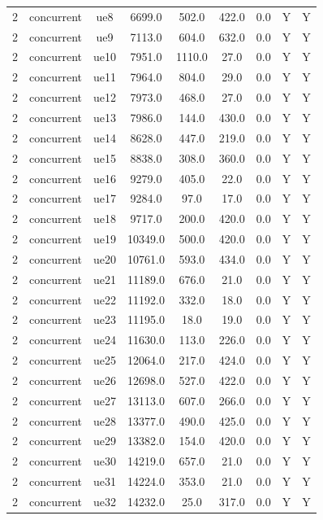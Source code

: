 \begin{table}[ht]
\begin{tabular}{|c|c|c|c|c|c|c|c|c|}
2 & concurrent & ue8 & 6699.0 & 502.0 & 422.0 & 0.0 & Y & Y \\
2 & concurrent & ue9 & 7113.0 & 604.0 & 632.0 & 0.0 & Y & Y \\
2 & concurrent & ue10 & 7951.0 & 1110.0 & 27.0 & 0.0 & Y & Y \\
2 & concurrent & ue11 & 7964.0 & 804.0 & 29.0 & 0.0 & Y & Y \\
2 & concurrent & ue12 & 7973.0 & 468.0 & 27.0 & 0.0 & Y & Y \\
2 & concurrent & ue13 & 7986.0 & 144.0 & 430.0 & 0.0 & Y & Y \\
2 & concurrent & ue14 & 8628.0 & 447.0 & 219.0 & 0.0 & Y & Y \\
2 & concurrent & ue15 & 8838.0 & 308.0 & 360.0 & 0.0 & Y & Y \\
2 & concurrent & ue16 & 9279.0 & 405.0 & 22.0 & 0.0 & Y & Y \\
2 & concurrent & ue17 & 9284.0 & 97.0 & 17.0 & 0.0 & Y & Y \\
2 & concurrent & ue18 & 9717.0 & 200.0 & 420.0 & 0.0 & Y & Y \\
2 & concurrent & ue19 & 10349.0 & 500.0 & 420.0 & 0.0 & Y & Y \\
2 & concurrent & ue20 & 10761.0 & 593.0 & 434.0 & 0.0 & Y & Y \\
2 & concurrent & ue21 & 11189.0 & 676.0 & 21.0 & 0.0 & Y & Y \\
2 & concurrent & ue22 & 11192.0 & 332.0 & 18.0 & 0.0 & Y & Y \\
2 & concurrent & ue23 & 11195.0 & 18.0 & 19.0 & 0.0 & Y & Y \\
2 & concurrent & ue24 & 11630.0 & 113.0 & 226.0 & 0.0 & Y & Y \\
2 & concurrent & ue25 & 12064.0 & 217.0 & 424.0 & 0.0 & Y & Y \\
2 & concurrent & ue26 & 12698.0 & 527.0 & 422.0 & 0.0 & Y & Y \\
2 & concurrent & ue27 & 13113.0 & 607.0 & 266.0 & 0.0 & Y & Y \\
2 & concurrent & ue28 & 13377.0 & 490.0 & 425.0 & 0.0 & Y & Y \\
2 & concurrent & ue29 & 13382.0 & 154.0 & 420.0 & 0.0 & Y & Y \\
2 & concurrent & ue30 & 14219.0 & 657.0 & 21.0 & 0.0 & Y & Y \\
2 & concurrent & ue31 & 14224.0 & 353.0 & 21.0 & 0.0 & Y & Y \\
2 & concurrent & ue32 & 14232.0 & 25.0 & 317.0 & 0.0 & Y & Y \\

\end{tabular}
\end{table}
